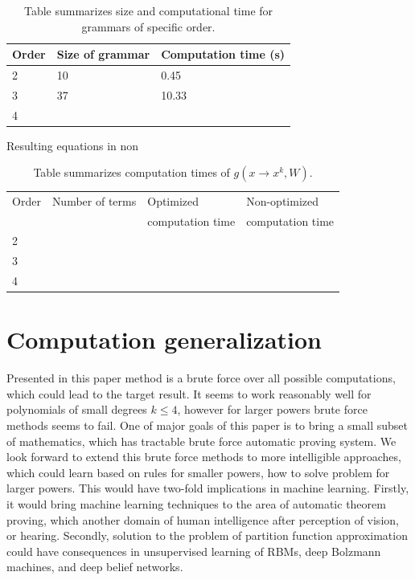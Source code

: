\documentclass{article}
\begin{document}
\begin{table}
\tiny
\centering
\begin{tabular}{|l||l|l|}
\hline
Order & Size of grammar & Computation time (s) \\
\hline\hline
2 & 10 & 0.45 \\
3 & 37 & 10.33 \\
4 & & \\
\hline
\end{tabular}
\caption{Table summarizes size and computational time for grammars of specific order.}
\label{grammars}
\end{table}

Resulting equations in non 

\begin{table}
\tiny
\centering
\begin{tabular}{|l||l|l|l|}
\hline
Order & Number of terms & Optimized & Non-optimized \\
& & computation time & computation time  \\
\hline\hline
2 & & & \\
3 & & & \\
4 & & & \\
\hline
\end{tabular}
\caption{Table summarizes computation times of $g(x \rightarrow x^k, W)$.}
\label{grammars}
\end{table}


\section{Computation generalization}\label{agenda}

Presented in this paper method is a brute force over all possible computations, 
which could lead to the target result. It seems to work reasonably well
for polynomials of small degrees $k \leq 4$, however for larger powers 
brute force methods seems to fail. One of major goals of this paper is to
bring a small subset of mathematics, which has tractable brute force automatic proving
system. We look forward to extend this brute force methods to more intelligible approaches, which
could learn based on rules for smaller powers, how to solve problem for larger powers. This would
have two-fold implications in machine learning. Firstly, it would bring machine learning techniques
to the area of automatic theorem proving, which another domain of human intelligence after perception
of vision, or hearing. Secondly, solution to the problem of partition function approximation
could have consequences in unsupervised learning of RBMs, deep Bolzmann machines, and deep
belief networks. 
\end{document}
